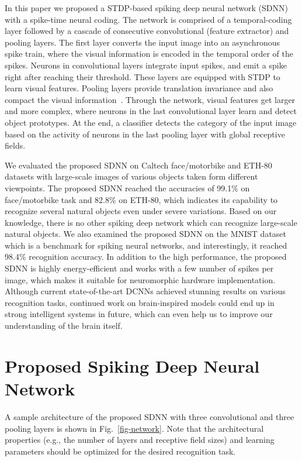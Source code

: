 \documentclass[preprint,5p,12pt,twocolumn]{article}
\begin{document}
In this paper we proposed a STDP-based spiking deep neural network (SDNN) with a spike-time neural coding. The network is comprised of a temporal-coding layer followed by a cascade of consecutive convolutional (feature extractor) and pooling layers. The first layer converts the input image into an asynchronous spike train, where the visual information is encoded in the temporal order of the spikes. Neurons in convolutional layers integrate input spikes, and emit a spike right after reaching their threshold. These layers are equipped with STDP to learn visual features. Pooling layers provide translation  invariance and also compact the visual information~\cite{Serre2007.PAMI}. Through the network, visual features get larger and more complex, where neurons in the last convolutional layer learn and detect object prototypes. At the end, a classifier detects the category of the input image based on the activity of neurons in the last pooling layer with global receptive fields.

We evaluated the proposed SDNN on Caltech face/motorbike and ETH-80 datasets with large-scale images of various objects taken form different viewpoints. The proposed SDNN reached the accuracies of 99.1\% on face/motorbike task and 82.8\% on ETH-80, which indicates its capability to recognize several natural objects even under severe variations. Based on our knowledge, there is no other spiking deep network which can recognize large-scale natural objects. We also examined the proposed SDNN on the MNIST dataset which is a benchmark for spiking neural networks, and interestingly, it reached 98.4\% recognition accuracy. In addition to the high performance, the proposed SDNN is highly energy-efficient and works with a few number of spikes per image, which makes it suitable for neuromorphic hardware implementation. Although current state-of-the-art DCNNs achieved stunning results on various recognition tasks, continued work on  brain-inspired models could end up in strong intelligent systems in future, which can even help us to improve our understanding of the brain itself.


\section*{Proposed Spiking Deep Neural Network}
A sample architecture of the proposed SDNN with three convolutional and three pooling layers is shown in Fig.~\ref{fig-network}. Note that the architectural properties (e.g., the number of layers and receptive field sizes) and learning parameters should be optimized for the desired recognition task. 
\end{document}

